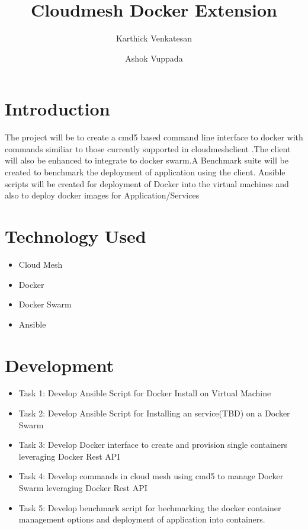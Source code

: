\documentclass[9pt,twocolumn,twoside]{../../styles/osajnl}
\title{Cloudmesh Docker Extension}
\author[1]{Karthick Venkatesan}
\author[1]{Ashok Vuppada}
\affil[1]{School of Informatics and Computing, Bloomington, IN 47408, U.S.A.}
\begin{document}
\maketitle



\section{Introduction}

The project will be to create a cmd5 based command line interface to docker with commands similiar to those currently supported in cloudmeshclient .The client will also be enhanced to integrate  to docker swarm.A Benchmark suite will be created to benchmark the deployment of application using the client.
Ansible scripts will be created for deployment of Docker into the virtual machines and also to deploy docker images  for Application/Services

\section{Technology Used}

\renewcommand{\labelitemi}{\scriptsize$\square$} 

\begin{itemize}
\item Cloud Mesh
\item Docker
\item Docker Swarm
\item Ansible
\end{itemize}

\section{Development}

\renewcommand{\labelitemi}{\scriptsize$\square$} 

\begin{itemize}
\item Task 1: Develop Ansible Script for Docker Install on Virtual Machine
 
\item Task 2: Develop Ansible Script for Installing an service(TBD) on a Docker Swarm 

\item Task 3: Develop Docker interface to create and provision single containers leveraging Docker Rest API

\item Task 4: Develop commands in cloud mesh using cmd5 to manage Docker Swarm leveraging Docker Rest API

\item Task 5: Develop benchmark script for bechmarking the docker container management options and deployment of application into containers.
\end{itemize}
\end{document}
